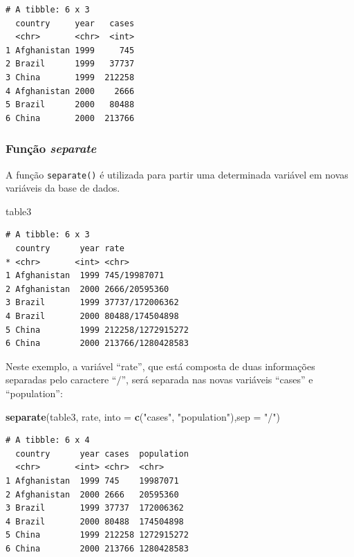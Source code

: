 \documentclass[12pt,brazil,oneside]{book}
\newenvironment{Shaded}{\begin{snugshade}}{\end{snugshade}}
\newcommand{\DataTypeTok}[1]{\textcolor[rgb]{0.13,0.29,0.53}{#1}}
\newcommand{\KeywordTok}[1]{\textcolor[rgb]{0.13,0.29,0.53}{\textbf{#1}}}
\newcommand{\NormalTok}[1]{#1}
\newcommand{\StringTok}[1]{\textcolor[rgb]{0.31,0.60,0.02}{#1}}
\begin{document}
\begin{verbatim}
# A tibble: 6 x 3
  country     year   cases
  <chr>       <chr>  <int>
1 Afghanistan 1999     745
2 Brazil      1999   37737
3 China       1999  212258
4 Afghanistan 2000    2666
5 Brazil      2000   80488
6 China       2000  213766
\end{verbatim}

\hypertarget{funcao-separate}{%
\subsubsection{\texorpdfstring{Função \emph{separate}}{Função separate}}\label{funcao-separate}}

A função \texttt{separate()} é utilizada para partir uma determinada variável em novas variáveis da base de dados.

\begin{Shaded}
\begin{Highlighting}[]
\NormalTok{table3}
\end{Highlighting}
\end{Shaded}

\begin{verbatim}
# A tibble: 6 x 3
  country      year rate             
* <chr>       <int> <chr>            
1 Afghanistan  1999 745/19987071     
2 Afghanistan  2000 2666/20595360    
3 Brazil       1999 37737/172006362  
4 Brazil       2000 80488/174504898  
5 China        1999 212258/1272915272
6 China        2000 213766/1280428583
\end{verbatim}

Neste exemplo, a variável ``rate'', que está composta de duas informações separadas pelo caractere ``\(/\)'', será separada nas novas variáveis ``cases'' e ``population'':

\begin{Shaded}
\begin{Highlighting}[]
\KeywordTok{separate}\NormalTok{(table3, rate, }\DataTypeTok{into =} \KeywordTok{c}\NormalTok{(}\StringTok{"cases"}\NormalTok{, }\StringTok{"population"}\NormalTok{),}\DataTypeTok{sep =} \StringTok{"/"}\NormalTok{)}
\end{Highlighting}
\end{Shaded}

\begin{verbatim}
# A tibble: 6 x 4
  country      year cases  population
  <chr>       <int> <chr>  <chr>     
1 Afghanistan  1999 745    19987071  
2 Afghanistan  2000 2666   20595360  
3 Brazil       1999 37737  172006362 
4 Brazil       2000 80488  174504898 
5 China        1999 212258 1272915272
6 China        2000 213766 1280428583
\end{verbatim}
\end{document}
